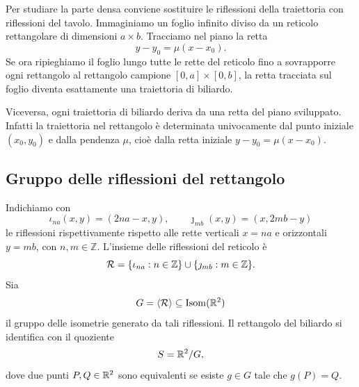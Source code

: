 \documentclass[a4paper]{article}
\begin{document}
Per studiare la parte densa conviene sostituire le riflessioni della traiettoria con riflessioni del tavolo. Immaginiamo un foglio infinito diviso da un reticolo rettangolare di dimensioni \(a\times b\). Tracciamo nel piano la retta
\[
    y-y_0=\mu(x-x_0).
\]
Se ora ripieghiamo il foglio lungo tutte le rette del reticolo fino a sovrapporre ogni rettangolo al rettangolo campione \([0,a]\times[0,b]\), la retta tracciata sul foglio diventa esattamente una traiettoria di biliardo.

\begin{center}
\end{center}
Viceversa, ogni traiettoria di biliardo deriva da una retta del piano sviluppato. Infatti la traiettoria nel rettangolo è determinata univocamente dal punto iniziale \((x_0,y_0)\) e dalla pendenza \(\mu\), cioè dalla retta iniziale \(y-y_0=\mu(x-x_0)\).

\subsection{Gruppo delle riflessioni del rettangolo}

Indichiamo con
\[
    \iota_{na}(x,y)=(2na-x,y),
    \qquad
    \jmath_{mb}(x,y)=(x,2mb-y)
\]
le riflessioni rispettivamente rispetto alle rette verticali \(x=na\) e orizzontali \(y=mb\), con \(n,m\in \mathbb{Z}\). L'insieme delle riflessioni del reticolo è
\[
    \mathcal{R}
    =
    \{\iota_{na}:n\in\mathbb{Z}\}
    \cup
    \{\jmath_{mb}:m\in\mathbb{Z}\}.
\]
Sia
\[
    G=\langle \mathcal{R}\rangle \subseteq \operatorname{Isom}(\mathbb{R}^2)
\]
il gruppo delle isometrie generato da tali riflessioni. Il rettangolo del biliardo si identifica con il quoziente
\[
    S=\mathbb{R}^2/G,
\]
dove due punti \(P,Q\in\mathbb{R}^2\) sono equivalenti se esiste \(g\in G\) tale che \(g(P)=Q\).
\end{document}
